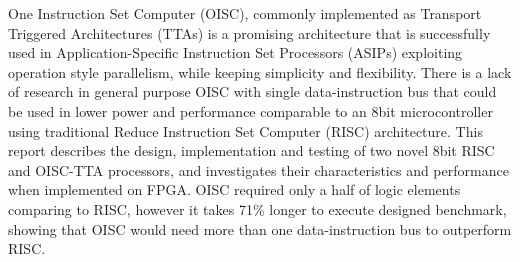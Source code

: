 \iffalse
The abstract is written last and summarises the important points you are making in the report using one sentence for each point:

* What is the topic of the work? What is the goal?
* Why are you doing it? What are your motivations?
* Does this work appear in the literature and if so, what are you doing differently?
* What is the most significant result? Was it unexpected? What impact will it have?
\fi

One Instruction Set Computer (OISC), commonly implemented as Transport Triggered Architectures (TTAs) is a promising architecture that is successfully used in Application-Specific Instruction Set Processors (ASIPs) exploiting operation style parallelism, while keeping simplicity and flexibility. There is a lack of research in general purpose OISC with single data-instruction bus that could be used in lower power and performance comparable to an 8bit microcontroller using traditional Reduce Instruction Set Computer (RISC) architecture. This report describes the design, implementation and testing of two novel 8bit RISC and OISC-TTA processors, and investigates their characteristics and performance when implemented on FPGA. OISC required only a half of logic elements comparing to RISC, however it takes 71\% longer to execute designed benchmark, showing that OISC would need more than one data-instruction bus to outperform RISC.
